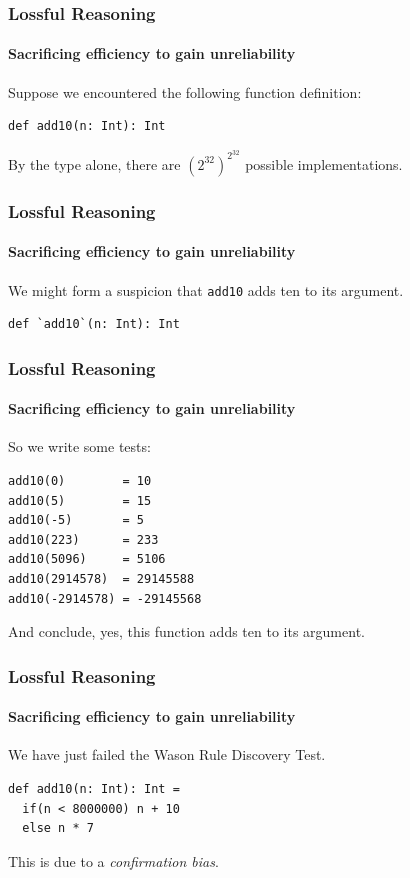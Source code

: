 \begin{frame}[fragile]
\frametitle{Lossful Reasoning}
\framesubtitle{Sacrificing efficiency to gain unreliability}
Suppose we encountered the following function definition:
\begin{lstlisting}[style=scala]
def add10(n: Int): Int
\end{lstlisting}
By the type alone, there are {$({2^{32}})^{2^{32}}$} possible implementations.
\end{frame}

\begin{frame}[fragile]
\frametitle{Lossful Reasoning}
\framesubtitle{Sacrificing efficiency to gain unreliability}
We might form a suspicion that \lstinline[style=scala]$add10$ adds ten to its argument.
\begin{lstlisting}[style=scala]
def `add10`(n: Int): Int
\end{lstlisting}
\end{frame}

\begin{frame}[fragile]
\frametitle{Lossful Reasoning}
\framesubtitle{Sacrificing efficiency to gain unreliability}
So we write some tests:
\begin{lstlisting}[style=scala]
add10(0)        = 10
add10(5)        = 15
add10(-5)       = 5
add10(223)      = 233
add10(5096)     = 5106
add10(2914578)  = 29145588
add10(-2914578) = -29145568
\end{lstlisting}
And conclude, yes, this function adds ten to its argument.
\end{frame}

\begin{frame}[fragile]
\frametitle{Lossful Reasoning}
\framesubtitle{Sacrificing efficiency to gain unreliability}
We have just failed the Wason Rule Discovery Test.
\begin{lstlisting}[style=scala]
def add10(n: Int): Int =
  if(n < 8000000) n + 10
  else n * 7
\end{lstlisting}
This is due to a \emph{confirmation bias\cite{gale2002does}}.
\end{frame}


